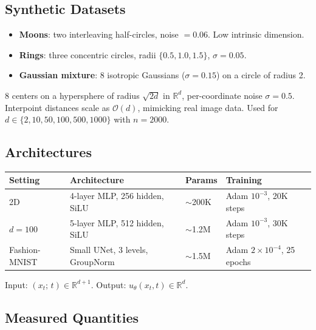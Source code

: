 \documentclass[11pt, a4paper]{article}
\newcommand{\Rd}{\mathbb{R}}
\theoremstyle{plain}
\theoremstyle{definition}
\theoremstyle{remark}
\begin{document}
\subsection{Synthetic Datasets}

\begin{defbox}
\begin{itemize}
  \item \textbf{Moons}: two interleaving half-circles, noise $= 0.06$. Low intrinsic dimension.
  \item \textbf{Rings}: three concentric circles, radii $\{0.5, 1.0, 1.5\}$, $\sigma = 0.05$.
  \item \textbf{Gaussian mixture}: 8 isotropic Gaussians ($\sigma=0.15$) on a circle of radius 2.
\end{itemize}
\end{defbox}

\begin{defbox}
8 centers on a hypersphere of radius $\sqrt{2d}$ in $\Rd^d$, per-coordinate noise $\sigma = 0.5$. Interpoint distances scale as $\mathcal{O}(d)$, mimicking real image data. Used for $d \in \{2, 10, 50, 100, 500, 1000\}$ with $n = 2000$.
\end{defbox}

\subsection{Architectures}

\begin{tabularx}{\textwidth}{lXlX}
\toprule
\textbf{Setting} & \textbf{Architecture} & \textbf{Params} & \textbf{Training} \\
\midrule
2D & 4-layer MLP, 256 hidden, SiLU & $\sim$200K & Adam $10^{-3}$, 20K steps \\
$d=100$ & 5-layer MLP, 512 hidden, SiLU & $\sim$1.2M & Adam $10^{-3}$, 30K steps \\
Fashion-MNIST & Small UNet, 3 levels, GroupNorm & $\sim$1.5M & Adam $2\!\times\!10^{-4}$, 25 epochs \\
\bottomrule
\end{tabularx}

Input: $(x_t;\, t) \in \Rd^{d+1}$. Output: $u_\theta(x_t, t) \in \Rd^d$.

\subsection{Measured Quantities}
\end{document}

